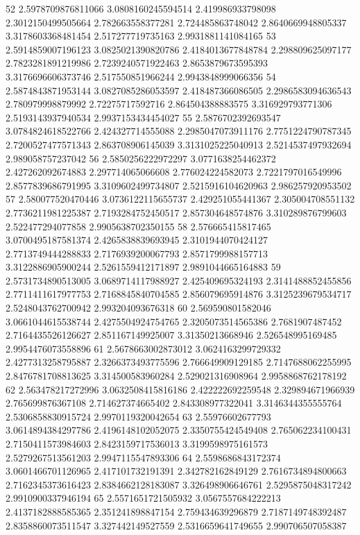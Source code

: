 52 2.5978709876811066 3.0808160245594514 2.419986933798098 2.3012150499505664 2.782663558377281 2.724485863748042 2.8640669948805337 3.3178603368481454 2.517277719735163 2.9931881141084165
53 2.5914859007196123 3.0825021390820786 2.4184013677848784 2.298809625097177 2.7823281891219986 2.7239240571922463 2.8653879673595393 3.3176696606373746 2.517550851966244 2.9943848999066356
54 2.5874843871953144 3.0827085286053597 2.418487366086505 2.2986583094636543 2.780979998879992 2.72275717592716 2.864504388883575 3.316929793771306 2.5193143937940534 2.9937153434454027
55 2.5876702392693547 3.0784824618522766 2.424327714555088 2.2985047073911176 2.7751224790787345 2.7200527477571343 2.863708906145039 3.3131025225040913 2.5214537497932694 2.989058757237042
56 2.5850256222972297 3.0771638254462372 2.427262092674883 2.297714065066608 2.776024224582073 2.7221797016549996 2.8577839686791995 3.3109602499734807 2.5215916104620963 2.986257920953502
57 2.580077520470446 3.0736122115655737 2.429251055441367 2.305004708551132 2.7736211981225387 2.7193284752450517 2.857304648574876 3.310289876799603 2.522477294077858 2.9905638702350155
58 2.576665415817465 3.0700495187581374 2.4265838839693945 2.3101944070424127 2.7713749444288833 2.7176939200067793 2.8571799988157713 3.3122886905900244 2.5261559412171897 2.9891044665164883
59 2.5731734890513005 3.0689714117988927 2.425409695324193 2.3141488852455856 2.7711411617977753 2.7168845840704585 2.856079695914876 3.3125239679534717 2.5248043762700942 2.993204093676318
60 2.569590801582046 3.0661044615538744 2.4275504924754765 2.3205073514565386 2.7681907487452 2.7164435526126627 2.851167149925007 3.31350213668946 2.526548995169485 2.9954476073558896
61 2.5678663002873012 3.0624163299729332 2.4277313258795887 2.3266373493775596 2.766649909129185 2.7147688062255995 2.8476781708813625 3.314500583960284 2.529021316908964 2.9958868762178192
62 2.563478217272996 3.0632508415816186 2.422222692259548 2.329894671966939 2.765699876367108 2.714627374665402 2.843308977322041 3.3146344355555764 2.5306858830915724 2.9970119320042654
63 2.55976602677793 3.0614894384297786 2.4196148102052075 2.3350755424549408 2.765062234100431 2.7150411573984603 2.8423159717536013 3.3199598975161573 2.5279267513561203 2.9947115547893306
64 2.5598686843172374 3.0601466701126965 2.417101732191391 2.342782162849129 2.7616734894800663 2.7162345373616423 2.8384662128183087 3.326498906646761 2.5295875048317242 2.9910900337946194
65 2.5571651721505932 3.0567557684222213 2.4137182888585365 2.351241898847154 2.759434639296879 2.7187149748392487 2.8358860073511547 3.327442149527559 2.5316659641749655 2.990706507058387

